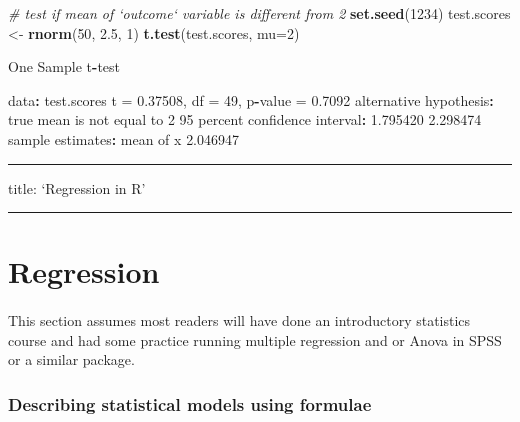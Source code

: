 \documentclass[]{article}
\newenvironment{Shaded}{\begin{snugshade}}{\end{snugshade}}
\newcommand{\CommentTok}[1]{\textcolor[rgb]{0.56,0.35,0.01}{\textit{#1}}}
\newcommand{\DataTypeTok}[1]{\textcolor[rgb]{0.13,0.29,0.53}{#1}}
\newcommand{\DecValTok}[1]{\textcolor[rgb]{0.00,0.00,0.81}{#1}}
\newcommand{\FloatTok}[1]{\textcolor[rgb]{0.00,0.00,0.81}{#1}}
\newcommand{\KeywordTok}[1]{\textcolor[rgb]{0.13,0.29,0.53}{\textbf{#1}}}
\newcommand{\NormalTok}[1]{#1}
\newcommand{\OperatorTok}[1]{\textcolor[rgb]{0.81,0.36,0.00}{\textbf{#1}}}
\newcommand{\StringTok}[1]{\textcolor[rgb]{0.31,0.60,0.02}{#1}}
\let\oldparagraph\paragraph
\renewcommand{\paragraph}[1]{\oldparagraph{#1}\mbox{}}
\begin{document}
\begin{Shaded}
\begin{Highlighting}[]
\CommentTok{# test if mean of `outcome` variable is different from 2}
\KeywordTok{set.seed}\NormalTok{(}\DecValTok{1234}\NormalTok{)}
\NormalTok{test.scores <-}\StringTok{ }\KeywordTok{rnorm}\NormalTok{(}\DecValTok{50}\NormalTok{, }\FloatTok{2.5}\NormalTok{, }\DecValTok{1}\NormalTok{)}
\KeywordTok{t.test}\NormalTok{(test.scores, }\DataTypeTok{mu=}\DecValTok{2}\NormalTok{)}

\NormalTok{    One Sample t}\OperatorTok{-}\NormalTok{test}

\NormalTok{data}\OperatorTok{:}\StringTok{  }\NormalTok{test.scores}
\NormalTok{t =}\StringTok{ }\FloatTok{0.37508}\NormalTok{, df =}\StringTok{ }\DecValTok{49}\NormalTok{, p}\OperatorTok{-}\NormalTok{value =}\StringTok{ }\FloatTok{0.7092}
\NormalTok{alternative hypothesis}\OperatorTok{:}\StringTok{ }\NormalTok{true mean is not equal to }\DecValTok{2}
\DecValTok{95}\NormalTok{ percent confidence interval}\OperatorTok{:}
\StringTok{ }\FloatTok{1.795420} \FloatTok{2.298474}
\NormalTok{sample estimates}\OperatorTok{:}
\NormalTok{mean of x }
 \FloatTok{2.046947} 
\end{Highlighting}
\end{Shaded}

\begin{center}\rule{0.5\linewidth}{\linethickness}\end{center}

title: `Regression in R'

\begin{center}\rule{0.5\linewidth}{\linethickness}\end{center}

\hypertarget{linear-models-simple}{%
\section{Regression}\label{linear-models-simple}}

\hypertarget{section-8}{%
\paragraph{}\label{section-8}}

This section assumes most readers will have done an introductory statistics
course and had some practice running multiple regression and or Anova in SPSS or
a similar package.

\hypertarget{formulae}{%
\subsubsection*{Describing statistical models using formulae}\label{formulae}}
\end{document}

